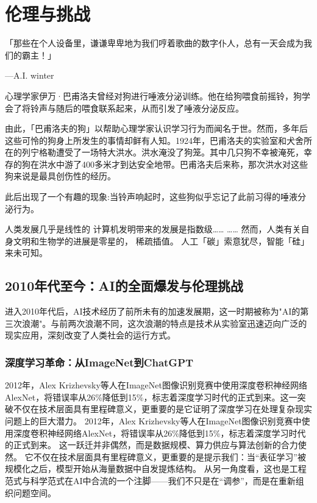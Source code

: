 \chapter{伦理与挑战}
「那些在个人设备里，谦谦卑卑地为我们哼着歌曲的数字仆人，总有一天会成为我们的霸主！」
\begin{flushright}
---A.I. winter
\end{flushright}

心理学家伊万·巴甫洛夫曾经对狗进行唾液分泌训练。他在给狗喂食前摇铃，狗学会了将铃声与随后的喂食联系起来，从而引发了唾液分泌反应。

由此，「巴甫洛夫的狗」以帮助心理学家认识学习行为而闻名于世。然而，多年后这些可怜的狗身上所发生的事情却鲜有人知。1924年，巴甫洛夫的实验室和犬舍所在的列宁格勒遭受了一场特大洪水。洪水淹没了狗笼。其中几只狗不幸被淹死，幸存的狗在洪水中游了400多米才到达安全地带。巴甫洛夫后来称，那次洪水对这些狗来说是最具创伤性的经历。

此后出现了一个有趣的现象:当铃声响起时，这些狗似乎忘记了此前习得的唾液分泌行为。

人类发展几乎是线性的
计算机发明带来的发展是指数级……
……
然而，人类有关自身文明和生物学的进展是零星的， 稀疏插值。
人工「碳」索意犹尽，智能「硅」来未可知。

\section{2010年代至今：AI的全面爆发与伦理挑战}

进入2010年代后，AI技术经历了前所未有的加速发展期，这一时期被称为"AI的第三次浪潮"。与前两次浪潮不同，这次浪潮的特点是技术从实验室迅速迈向广泛的现实应用，深刻改变了人类社会的运行方式。

\subsection{深度学习革命：从ImageNet到ChatGPT}

2012年，Alex Krizhevsky等人在ImageNet图像识别竞赛中使用深度卷积神经网络AlexNet，将错误率从26\%降低到15\%，标志着深度学习时代的正式到来。这一突破不仅在技术层面具有里程碑意义，更重要的是它证明了深度学习在处理复杂现实问题上的巨大潜力。
2012年，Alex Krizhevsky等人在ImageNet图像识别竞赛中使用深度卷积神经网络AlexNet，将错误率从26\%降低到15\%，标志着深度学习时代的正式到来。 
这一跃迁并非偶然，而是数据规模、算力供应与算法创新的合力使然。 
它不仅在技术层面具有里程碑意义，更重要的是提示我们：当“表征学习”被规模化之后，模型开始从海量数据中自发提炼结构。 
从另一角度看，这也是工程范式与科学范式在AI中合流的一个注脚——我们不只是在“调参”，而是在重新组织问题空间。

